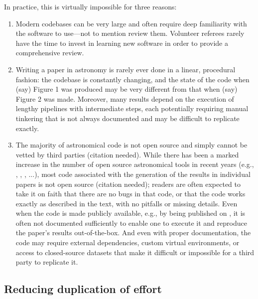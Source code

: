 \documentclass{aastex631}
\newcommand\needscite{{\color{red}(citation needed)}}
\begin{document}
%
In practice, this is virtually impossible for three reasons:
%
\begin{enumerate}
    \item Modern codebases can be very large and often require deep familiarity with the software to use---not to mention review them. Volunteer referees rarely have the time to invest in learning new software in order to provide a comprehensive review.
    \item  Writing a paper in astronomy is rarely ever done in a linear, procedural fashion: the codebase is constantly changing, and the state of the code when (say) Figure 1 was produced may be very different from that when (say) Figure 2 was made. 
    Moreover, many results depend on the execution of lengthy pipelines with intermediate steps, each potentially requiring manual tinkering that is not always documented and may be difficult to replicate exactly.
    \item The majority of astronomical code is not open source and simply cannot be vetted by third parties \needscite. 
    While there has been a marked increase in the number of open source astronomical tools in recent years (e.g., \astropy, \exoplanet, \emcee, \exofast...), most code associated with the generation of the results in individual papers is not open source \needscite; readers are often expected to take it on faith that there are no bugs in that code, or that the code works exactly as described in the text, with no pitfalls or missing details. 
    Even when the code is made publicly available, e.g., by being published on \GitHub, it is often not documented sufficiently to enable one to execute it and reproduce the paper's results out-of-the-box. 
    And even with proper documentation, the code may require external dependencies, custom virtual environments, or access to closed-source datasets that make it difficult or impossible for a third party to replicate it.
\end{enumerate}
%

\subsection{Reducing duplication of effort}
\label{sec:args:duplication}
%
%
\end{document}
